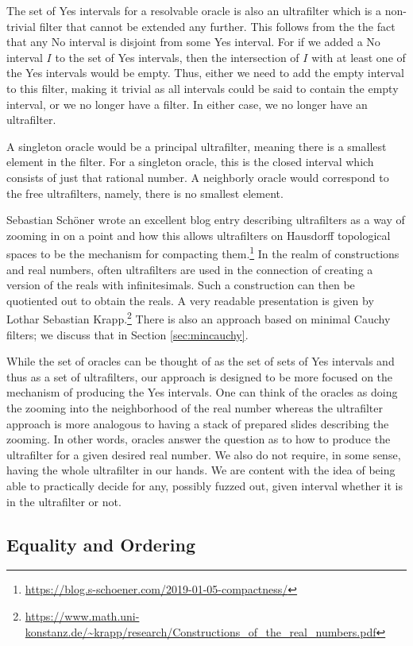 \documentclass[12pt]{article}
\begin{document}
 The set of Yes intervals for a resolvable oracle is also an ultrafilter which is a non-trivial filter that cannot be extended any further. This follows from the the fact that any No interval is disjoint from some Yes interval. For if we added a No interval $I$ to the set of Yes intervals, then the intersection of $I$ with at least one of the Yes intervals would be empty. Thus, either we need to add the empty interval to this filter, making it trivial as all intervals could be said to contain the empty interval, or we no longer have a filter. In either case, we no longer have an ultrafilter. 

A singleton oracle would be a principal ultrafilter, meaning there is a smallest element in the filter. For a singleton oracle, this is the closed interval which consists of just that rational number. A neighborly oracle would correspond to the free ultrafilters, namely, there is no smallest element. 

Sebastian Schöner wrote an excellent blog entry describing ultrafilters as a way of zooming in on a point and how this allows ultrafilters on Hausdorff topological spaces to be the mechanism for compacting them.\footnote{\url{https://blog.s-schoener.com/2019-01-05-compactness/}} In the realm of constructions and real numbers, often ultrafilters are used in the connection of creating a version of the reals with infinitesimals. Such a construction can then be quotiented out to obtain the reals. A very readable presentation is given by Lothar Sebastian Krapp.\footnote{\url{https://www.math.uni-konstanz.de/~krapp/research/Constructions_of_the_real_numbers.pdf}} There is also an approach based on minimal Cauchy filters; we discuss that in Section \ref{sec:mincauchy}.

While the set of oracles can be thought of as the set of sets of Yes intervals and thus as a set of ultrafilters, our approach is designed to be more focused on the mechanism of producing the Yes intervals. One can think of the oracles as doing the zooming into the neighborhood of the real number whereas the ultrafilter approach is more analogous to having a stack of prepared slides describing the zooming. In other words, oracles answer the question as to how to produce the ultrafilter for a given desired real number. We also do not require, in some sense, having the whole ultrafilter in our hands. We are content with the idea of being able to practically decide for any, possibly fuzzed out, given interval whether it is in the ultrafilter or not.  

\subsection{Equality and Ordering}
\end{document}
